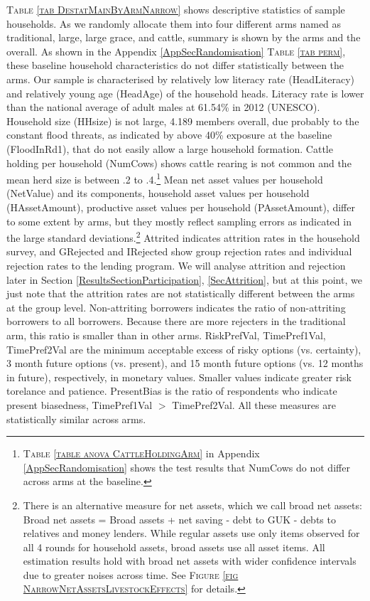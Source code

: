 	\textsc{\small Table \ref{tab DestatMainByArmNarrow}} shows descriptive statistics of sample households. As we randomly allocate them into four different arms named as \textsf{traditional}, \textsf{large}, \textsf{large grace}, and \textsf{cattle}, summary is shown by the arms and the overall. As shown in the Appendix \ref{AppSecRandomisation} \textsc{\normalsize Table \ref{tab perm}}, these baseline household characteristics do not differ statistically between the arms. Our sample is characterised by relatively low literacy rate (\textsf{HeadLiteracy}) and relatively young age (\textsf{HeadAge}) of the household heads. Literacy rate is lower than the national average of adult males at 61.54\% in 2012 (UNESCO). Household size (\textsf{HHsize}) is not large, 4.189 members overall, due probably to the constant flood threats, as indicated by above 40\% exposure at the baseline (\textsf{FloodInRd1}), that do not easily allow a large household formation. Cattle holding per household (\textsf{NumCows}) shows cattle rearing is not common and the mean herd size is between .2 to .4.\footnote{ \textsc{Table \ref{table anova CattleHoldingArm}} in Appendix \ref{AppSecRandomisation} shows the test results that \textsf{NumCows} do not differ across arms at the baseline. } Mean net asset values per household (\textsf{NetValue}) and its components, household asset values per household (\textsf{HAssetAmount}), productive asset values per household (\textsf{PAssetAmount}), differ to some extent by arms, but they mostly reflect sampling errors as indicated in the large standard deviations.\footnote{There is an alternative measure for net assets, which we call broad net assets: Broad net assets = Broad assets + net saving - debt to GUK - debts to relatives and money lenders. While regular assets use only items observed for all 4 rounds for household assets, broad assets use all asset items. All estimation results hold with broad net assets with wider confidence intervals due to greater noises across time. See \textsc{\footnotesize Figure \ref{fig NarrowNetAssetsLivestockEffects}} for details. } \textsf{Attrited} indicates attrition rates in the household survey, and \textsf{GRejected} and \textsf{IRejected} show group rejection rates and individual rejection rates to the lending program. We will analyse attrition and rejection later in Section \ref{ResultsSectionParticipation}, \ref{SecAttrition}, but at this point, we just note that the attrition rates are not statistically different between the arms at the group level. \textsf{Non-attriting borrowers} indicates the ratio of non-attriting borrowers to all borrowers. Because there are more rejecters in the \textsf{traditional} arm, this ratio is smaller than in other arms. \textsf{RiskPrefVal, TimePref1Val, TimePref2Val} are the minimum acceptable excess of risky options (vs. certainty), 3 month future options (vs. present), and 15 month future options (vs. 12 months in future), respectively, in monetary values. \label{StudySamplePrefDescription} Smaller values indicate greater risk torelance and patience. \textsf{PresentBias} is the ratio of respondents who indicate present biasedness, \textsf{TimePref1Val} $>$ \textsf{TimePref2Val}. All these measures are statistically similar across arms.



